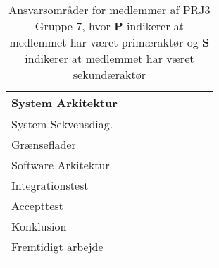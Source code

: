 \documentclass[Rapport/Rapport_main.tex]{subfiles}
\begin{document}
\begin{longtable}{|L{0.2\textwidth}|L{0.082\textwidth}|L{0.08\textwidth}|L{0.08\textwidth}|L{0.08\textwidth}|L{0.08\textwidth}|L{0.08\textwidth}|L{0.08\textwidth}|L{0.08\textwidth}|}
        System Arkitektur       &               &               &               &               &               &               &               &                \\ \hline
        System Sekvensdiag.     &               &               &               &               &               &               &               &                \\ \hline
        Grænseflader            &               &               &               &               &               &               &               &                \\ \hline
        Software Arkitektur     &               &               &               &               &               &               &               &                \\ \hline
        Integrationstest        &               &               &               &               &               &               &               &                \\ \hline
        Accepttest              &               &               &               &               &               &               &               &                \\ \hline
        Konklusion              &               &               &               &               &               &               &               &                \\ \hline 
        Fremtidigt arbejde      &               &               &               &               &               &               &               &                \\ \hline
\caption{Ansvarsområder for medlemmer af PRJ3 Gruppe 7, hvor \textbf{P} indikerer at medlemmet har været primæraktør og \textbf{S} indikerer at medlemmet har været sekundæraktør}
\end{longtable}
\end{document}
